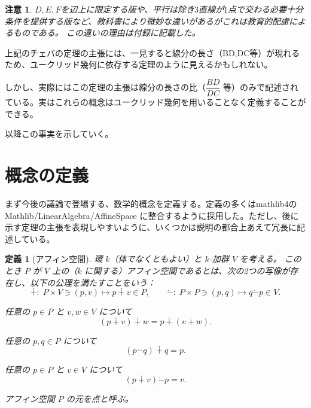 \documentclass[a4paper,12pt]{bxjsbook}
\newlength{\customindent}
\newenvironment{body}{
  \par
  \begingroup
  \setlength{\leftskip}{\customindent}
  \setlength{\rightskip}{0pt}
  \setlength{\parindent}{1em}
  \setlength{\displayindent}{\customindent}
  \setlength{\displaywidth}{\dimexpr\linewidth-\customindent\relax}
}{
  \par
  \endgroup
}
\theoremstyle{theorem}
\newtheorem{definition}[theorem]{定義}
\newtheorem{remark}[theorem]{注意}
\newcommand{\dotminus}{\mathbin{\dot{-}}}
\begin{document}
    \begin{remark}
        $D, E, F$を辺上に限定する版や、平行は除き$3$直線が$1$点で交わる必要十分条件を提供する版など、教科書により微妙な違いがあるがこれは教育的配慮によるものである。
        この違いの理由は付録に記載した。
    \end{remark}

    \begin{body}
        \indent 上記のチェバの定理の主張には、一見すると線分の長さ（BD,DC等）が現れるため、ユークリッド幾何に依存する定理のように見えるかもしれない。

        \indent しかし、実際にはこの定理の主張は線分の長さの比（$\dfrac{BD}{DC}$ 等）のみで記述されている。実はこれらの概念はユークリッド幾何を用いることなく定義することができる。

        \indent 以降この事実を示していく。
    \end{body}

    \section{概念の定義}
    \begin{body}
        \indent まず今後の議論で登場する、数学的概念を定義する。定義の多くはmathlib4の Mathlib/LinearAlgebra/AffineSpace に整合するように採用した。ただし、後に示す定理の主張を表現しやすいように、いくつかは説明の都合上あえて冗長に記述している。
    \end{body}

    \begin{definition}[アフィン空間]
        環 $k$（体でなくともよい）と $k$-加群 $V$ を考える。
        このとき $P$ が $V$ 上の（$k$ に関する）\emph{アフィン空間}であるとは、次の2つの写像が存在し、以下の公理を満たすことをいう：
        \[
        \dotplus :\; P\times V \ni (p,v) \mapsto p \dotplus v \in P,
        \qquad
        \dotminus:\; P\times P \ni (p,q) \mapsto q \dotminus p \in V.
        \]
        \begin{theoremitemize}[leftmargin=5em, topsep=2pt, partopsep=0pt, itemsep=0pt, parsep=0pt]
            \item[\hspace*{5em}\textbf{公理1}] 任意の $p\in P$ と $v,w\in V$ について
            \[
            (p\dotplus v)\dotplus w = p\dotplus (v+w).
            \]
            \item[\hspace*{5em}\textbf{公理2}] 任意の $p,q\in P$ について
            \[
            (p\dotminus q)\dotplus q = p.
            \]
            \item[\hspace*{5em}\textbf{公理3}] 任意の $p\in P$ と $v\in V$ について
            \[
            (p\dotplus v)\dotminus p = v.
            \]
        \end{theoremitemize}
        アフィン空間 $P$ の元を\emph{点}と呼ぶ。
    \end{definition}
\end{document}
